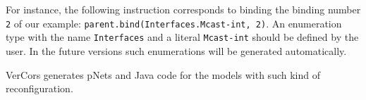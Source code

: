 \documentclass[12pt]{article}
\begin{document}
For instance, the following instruction corresponds to binding the binding number \texttt{2} of our example: \texttt{parent.bind(Interfaces.Mcast-int, 2)}. An enumeration type with the name \texttt{Interfaces} and a literal \texttt{Mcast-int} should be defined by the user. In the future versions such enumerations will be generated automatically.

VerCors generates pNets and Java code for the models with such kind of reconfiguration.
\end{document}
